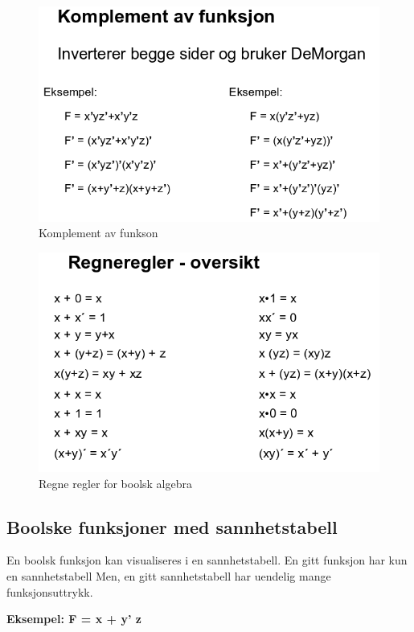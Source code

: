 \documentclass{article}
\begin{document}
	\begin{figure}[H]
		\includegraphics[scale=0.55]{Komplement.png}
		\caption{Komplement av funkson}
	\end{figure}
	
	\begin{figure}[H]
		\includegraphics[scale=0.6]{Regneregler.png}
		\caption{Regne regler for boolsk algebra}
	\end{figure}
	
	\subsection{Boolske funksjoner med sannhetstabell}
	En boolsk funksjon kan visualiseres i en 
	sannhetstabell.
	En gitt	funksjon har kun en	sannhetstabell 
	Men, en gitt sannhetstabell har uendelig mange funksjonsuttrykk.
	
	\textbf{Eksempel: F = x + y' z}
	
\end{document}
